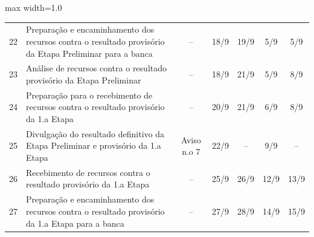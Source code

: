 \begin{quadro}[htb]
\begin{adjustbox}{max width=1.0\linewidth}
\begin{tabular}{|c|l|c|c|c|c|c|}
22 & Preparação e   encaminhamento dos recursos contra o resultado provisório da Etapa Preliminar   para a banca                                & –                   & 18/9                                                                            & 19/9                                  & 5/9                                                                             & 5/9                  \\
\rowcolor[HTML]{FCD5B4} 
23 & Análise de recursos   contra o resultado provisório da Etapa Preliminar                                                                    & –                   & 18/9                                                                            & 21/9                                  & 5/9                                                                             & 8/9                  \\
24 & Preparação para o   recebimento de recursos contra o resultado provisório da 1.a Etapa                                                     & –                   & 20/9                                                                            & 21/9                                  & 6/9                                                                             & 8/9                  \\
\rowcolor[HTML]{92CDDC} 
25 & Divulgação do   resultado definitivo da Etapa Preliminar e provisório da 1.a Etapa                                                         & Aviso n.o 7         & 22/9                                                                            & –                                     & 9/9                                                                             & –                    \\
26 & Recebimento de   recursos contra o resultado provisório da 1.a Etapa                                                                       & –                   & 25/9                                                                            & 26/9                                  & 12/9                                                                            & 13/9                 \\
27 & Preparação e   encaminhamento dos recursos contra o resultado provisório da 1.a Etapa para a   banca                                       & –                   & 27/9                                                                            & 28/9                                  & 14/9                                                                            & 15/9                 \\

\end{tabular}
\end{adjustbox}
\end{quadro}
